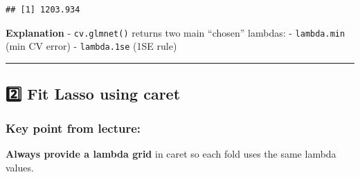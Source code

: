 \documentclass[
]{article}
\newenvironment{Shaded}{\begin{snugshade}}{\end{snugshade}}
\newcommand{\AttributeTok}[1]{\textcolor[rgb]{0.13,0.29,0.53}{#1}}
\newcommand{\CommentTok}[1]{\textcolor[rgb]{0.56,0.35,0.01}{\textit{#1}}}
\newcommand{\DecValTok}[1]{\textcolor[rgb]{0.00,0.00,0.81}{#1}}
\newcommand{\FloatTok}[1]{\textcolor[rgb]{0.00,0.00,0.81}{#1}}
\newcommand{\FunctionTok}[1]{\textcolor[rgb]{0.13,0.29,0.53}{\textbf{#1}}}
\newcommand{\NormalTok}[1]{#1}
\newcommand{\OtherTok}[1]{\textcolor[rgb]{0.56,0.35,0.01}{#1}}
\newcommand{\SpecialCharTok}[1]{\textcolor[rgb]{0.81,0.36,0.00}{\textbf{#1}}}
\newcommand{\StringTok}[1]{\textcolor[rgb]{0.31,0.60,0.02}{#1}}
\begin{document}
\begin{verbatim}
## [1] 1203.934
\end{verbatim}

\textbf{Explanation} - \texttt{cv.glmnet()} returns two main ``chosen''
lambdas: - \texttt{lambda.min} (min CV error) - \texttt{lambda.1se} (1SE
rule)

\begin{center}\rule{0.5\linewidth}{0.5pt}\end{center}

\subsection{\texorpdfstring{2️⃣ Fit Lasso using
\textbf{caret}}{2️⃣ Fit Lasso using caret}}\label{fit-lasso-using-caret}

\subsubsection{Key point from lecture:}\label{key-point-from-lecture}

\textbf{Always provide a lambda grid} in caret so each fold uses the
same lambda values.

\begin{Shaded}
\end{Shaded}
\end{document}
